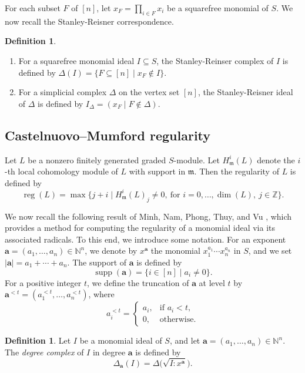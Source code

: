 \documentclass[12pt,amscd]{amsart}
\theoremstyle{definition}
\newtheorem{defn}[thm]{Definition}
\DeclareMathOperator{\supp}{supp}
\DeclareMathOperator{\reg}{reg}
\def\a {\mathbf a}
\def\NN {\mathbb{N}}
\begin{document}
For each subset $F$ of $[n]$, let $x_F = \prod_{i\in F} x_i$ be a squarefree monomial of $S$. We now recall the Stanley-Reisner correspondence. 
\begin{defn}
    
\begin{enumerate}
    \item For a squarefree monomial ideal $I \subseteq S$, the Stanley-Reinser complex of $I$ is defined by $\Delta(I) = \{ F \subseteq [n] \mid x_F \notin I\}$. 
    \item For a simplicial complex $\Delta$ on the vertex set $[n]$, the Stanley-Reisner ideal of $\Delta$ is defined by $I_\Delta = (x_F \mid F \notin \Delta)$. 
\end{enumerate}
\end{defn}

\subsection{Castelnuovo--Mumford regularity}

Let \( L \) be a nonzero finitely generated graded \( S \)-module. Let \( H_{\mathfrak{m}}^i(L) \) denote the \( i \)-th local cohomology module of \( L \) with support in \( \mathfrak{m} \). Then the  regularity of \( L \) is defined by
\[
\reg(L) = \max \{ j + i \mid H_{\mathfrak{m}}^i(L)_j \neq 0,\ \text{for } i = 0, \ldots, \dim(L),\ j \in \mathbb{Z} \}.
\]

We now recall the following result of Minh, Nam, Phong, Thuy, and Vu \cite{MNPTV}, which provides a method for computing the regularity of a monomial ideal via its associated radicals. To this end, we introduce some notation. For an exponent $\a = (a_1, \ldots, a_n) \in \NN^n$, we denote by $x^\a$ the monomial $x_1^{a_1} \cdots x_n^{a_n}$ in $S$, and we set $|\a| = a_1 + \cdots + a_n.$ The support of $\a$ is defined by
\[
\supp(\a) = \{ i \in [n] \mid a_i \neq 0 \}.
\]
For a positive integer $t$, we define the truncation of $\a$ at level $t$ by $\a^{<t} = (a_1^{<t}, \ldots, a_n^{<t})$, where
\[
a_i^{<t} =
\begin{cases}
a_i, & \text{if } a_i < t,\\
0, & \text{otherwise}.
\end{cases}
\]

\begin{defn}
Let $I$ be a monomial ideal of $S$, and let $\a = (a_1, \ldots, a_n) \in \NN^n$. The \emph{degree complex} of $I$ in degree $\a$ is defined by
\[
\Delta_{\a}(I) = \Delta\bigl(\sqrt{I : x^\a}\bigr).
\]
\end{defn}
\end{document}
